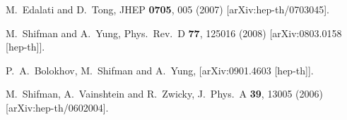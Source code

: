 \documentclass[12pt]{article}
\begin{document}
%
%
\small
\begin{thebibliography}{99}
\itemsep -2pt



  M.~Edalati and D.~Tong,
  JHEP {\bf 0705}, 005 (2007)
  [arXiv:hep-th/0703045].

  M.~Shifman and A.~Yung,
  Phys.\ Rev.\  D {\bf 77}, 125016 (2008)
  [arXiv:0803.0158 [hep-th]].

  P.~A.~Bolokhov, M.~Shifman and A.~Yung,
  [arXiv:0901.4603 [hep-th]].
  
  M.~Shifman, A.~Vainshtein and R.~Zwicky,
  J.\ Phys.\ A  {\bf 39}, 13005 (2006)
  [arXiv:hep-th/0602004].


\end{thebibliography}
\end{document}
